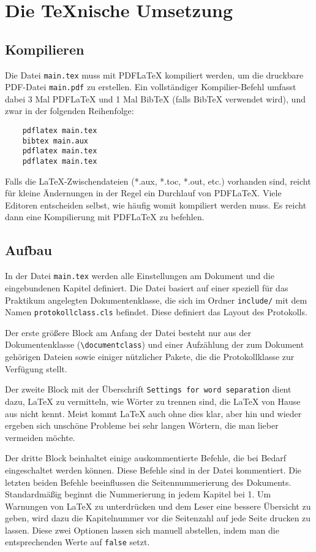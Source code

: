 \section{Die TeXnische Umsetzung}
\subsection{Kompilieren}
Die Datei \verb|main.tex| muss mit PDFLaTeX kompiliert werden, um die druckbare PDF-Datei \verb|main.pdf| zu erstellen. Ein vollständiger Kompilier-Befehl umfasst dabei 3 Mal PDFLaTeX und 1 Mal BibTeX (falls BibTeX verwendet wird), und zwar in der folgenden Reihenfolge:

\begin{verbatim}
	pdflatex main.tex
	bibtex main.aux
	pdflatex main.tex
	pdflatex main.tex
\end{verbatim}

Falls die LaTeX-Zwischendateien (*.aux, *.toc, *.out, etc.) vorhanden sind, reicht für kleine Ändernungen in der Regel ein Durchlauf von PDFLaTeX. Viele Editoren entscheiden selbst, wie häufig womit kompiliert werden muss. Es reicht dann eine Kompilierung mit PDFLaTeX zu befehlen.

\subsection{Aufbau}
In der Datei \verb|main.tex| werden alle Einstellungen am Dokument und die eingebundenen Kapitel definiert. Die Datei basiert auf einer speziell für das Praktikum angelegten Dokumentenklasse, die sich im Ordner \verb|include/| mit dem Namen \verb|protokollclass.cls| befindet. Diese definiert das Layout des Protokolls.

Der erste größere Block am Anfang der Datei besteht nur aus der Dokumentenklasse (\verb|\documentclass|) und einer Aufzählung der zum Dokument gehörigen Dateien sowie einiger nützlicher Pakete, die die Protokollklasse zur Verfügung stellt.

Der zweite Block mit der Überschrift \verb|Settings for word separation| dient dazu, LaTeX zu vermitteln, wie Wörter zu trennen sind, die LaTeX von Hause aus nicht kennt. Meist kommt LaTeX auch ohne dies klar, aber hin und wieder ergeben sich unschöne Probleme bei sehr langen Wörtern, die man lieber vermeiden möchte.

Der dritte Block beinhaltet einige auskommentierte Befehle, die bei Bedarf eingeschaltet werden können. Diese Befehle sind in der Datei kommentiert. Die letzten beiden Befehle beeinflussen die Seitennummerierung des Dokuments. Standardmäßig beginnt die Nummerierung in jedem Kapitel bei 1. Um Warnungen von LaTeX zu unterdrücken und dem Leser eine bessere Übersicht zu geben, wird dazu die Kapitelnummer vor die Seitenzahl auf jede Seite drucken zu lassen. Diese zwei Optionen lassen sich manuell abstellen, indem man die entsprechenden Werte auf \verb|false| setzt.

